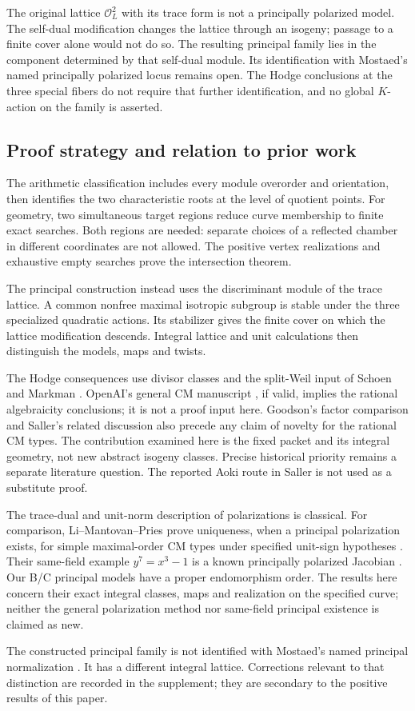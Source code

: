 \begin{remark}\label{rem:WKnormalization}
The original lattice $\mathcal O_L^2$ with its trace form is not a
principally polarized model. The self-dual modification changes the lattice
through an isogeny; passage to a finite cover alone would not do so.
The resulting principal family lies in the component determined by that
self-dual module. Its identification with Mostaed's named principally
polarized locus remains open. The Hodge conclusions at the three special
fibers do not require that further identification, and no global
$K$-action on the family is asserted.
\end{remark}

\subsection{Proof strategy and relation to prior work}
The arithmetic classification includes every module overorder and
orientation, then identifies the two characteristic roots at the level of
quotient points. For geometry, two simultaneous target regions reduce curve
membership to finite exact searches. Both regions are needed: separate
choices of a reflected chamber in different coordinates are not allowed.
The positive vertex realizations and exhaustive empty searches prove the
intersection theorem.

The principal construction instead uses the discriminant module of the
trace lattice. A common nonfree maximal isotropic subgroup is stable under
the three specialized quadratic actions. Its stabilizer gives the finite
cover on which the lattice modification descends. Integral lattice and
unit calculations then distinguish the models, maps and twists.

The Hodge consequences use divisor classes and the split-Weil input of
Schoen and Markman \cite{Schoen1998,Markman2025}. OpenAI's general CM
manuscript \cite{OpenAICM2026}, if valid, implies the rational algebraicity
conclusions; it is not a proof input here. Goodson's factor comparison and
Saller's related discussion \cite{Goodson2024,Saller2026} also precede any
claim of novelty for the rational CM types. The contribution examined here
is the fixed packet and its integral geometry, not new abstract isogeny
classes. Precise historical priority remains a separate literature question.
The reported Aoki route in Saller is not used as a substitute proof.

The trace-dual and unit-norm description of polarizations is classical.
For comparison, Li--Mantovan--Pries prove uniqueness, when a principal
polarization exists, for simple maximal-order CM types under specified
unit-sign hypotheses \cite[Prop.~4.5]{LiMantovanPries2021}. Their
same-field example $y^7=x^3-1$ is a known principally polarized Jacobian
\cite[Prop.~6.11 and Lemma~6.12]{LiMantovanPries2021}.
Our B/C principal models have a proper endomorphism order. The results
here concern their exact integral classes, maps and realization on the
specified curve; neither the general polarization method nor same-field
principal existence is claimed as new.

The constructed principal family is not identified with Mostaed's named
principal normalization \cite{Mostaed2026}. It has a different integral
lattice. Corrections relevant to that distinction are recorded in the
supplement; they are secondary to the positive results of this paper.
